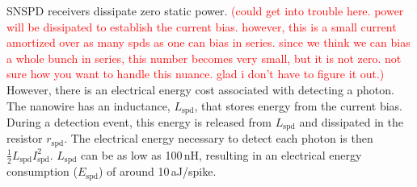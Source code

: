 \documentclass[twocolumn]{article}
\begin{document}
SNSPD receivers dissipate zero static power. \textcolor{red}{(could get into trouble here. power will be dissipated to establish the current bias. however, this is a small current amortized over as many spds as one can bias in series. since we think we can bias a whole bunch in series, this number becomes very small, but it is not zero. not sure how you want to handle this nuance. glad i don't have to figure it out.)} However, there is an electrical energy cost associated with detecting a photon. The nanowire has an inductance, $L_{\mathrm{spd}}$, that stores energy from the current bias. During a detection event, this energy is released from $L_{\mathrm{spd}}$ and dissipated in the resistor $r_{\mathrm{spd}}$. The electrical energy necessary to detect each photon is then $\frac{1}{2}L_{\mathrm{spd}}I_{\mathrm{spd}}^2$. $L_{\mathrm{spd}}$ can be as low as 100\,nH, resulting in an electrical energy consumption ($E_{\mathrm{spd}}$) of around 10\,aJ/spike.
\end{document}
